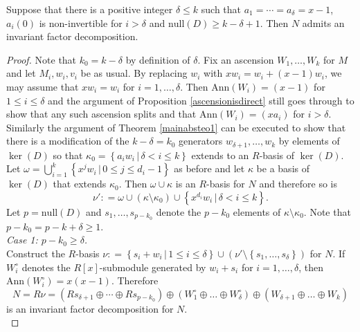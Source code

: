 \documentclass[ALCO, Unicode]{cedram}
\begin{document}
\begin{theorem}  \label{mainabsteo2}  Suppose that there  is  a positive integer  $ \delta   \leq  k    $ such that $ a_{1} = \cdots = a_{\delta} = x-1 $, $ a_{i}(0) $ is non-invertible for $ i > \delta $     and $  \mathrm{null}   (D) \geq k - \delta + 1 $.    Then $ N $ admits an invariant  factor   decomposition.    
\end{theorem}    

\begin{proof} Note that $k_0 = k - \delta$ by definition of $\delta$. Fix an ascension $ W_{1}, \ldots, W_{k} $ for $ M $ and let $ M_{i}, w_{i}, v_{i} $ be as  usual.  By replacing $ w_{i} $ with $ x w_{i} = w_{i} + (x-1)w_{i}  $, we may assume that $ x w_{i} = w_{i}  $ for $ i = 1, \ldots, \delta $. Then $ \mathrm{Ann}(W_{i}) = (x-1) $ for $1 \leq  i \leq \delta $ and the argument of Proposition \ref{ascensionisdirect} still goes through  to show that any such  ascension   splits and that $ \mathrm{Ann}(W_{i}) = ( x a_{i} ) $ for $ i > \delta $.   Similarly the argument of Theorem \ref{mainabsteo1} can be executed to show that there is a modification of  the $   k - \delta  =  k_{0}     $ generators $ w_{\delta+1} , \ldots, w_{k} $ by elements of $ \ker(D) $ so that  $ \kappa_{0}  =  \left \{ a_{i} w_{i} \, | \, \delta < i \leq k \right \} $ extends to an $R $-basis of $ \ker(D) $. Let $  \omega  = \bigcup_{i=1}^{k} \left \{  x^{j}   w_{i} \, | \, 0 \leq j \leq d_{i} - 1  \right \}  $ as before and let $ \kappa  $  be  a   basis of $ \ker (D ) $ that extends $ \kappa_{0} $. Then $ \omega \cup  \kappa $ is an $ R $-basis for $ N $ and therefore so is $$ \nu '    : = \omega   \cup ( \kappa \setminus \kappa_{0  } )  \cup \left \{ x^{d_{i}    }  w_{i} \, | \, \delta < i \leq k \right \} . $$   Let $ p  =  \mathrm{null} (D)   $ and  $ s_{1}, \ldots, s_{p-k_{0}} $ denote the $ p - k_{0} $  elements of $ \kappa \setminus \kappa_{0} $. Note that $ p - k_{0} = p - k + \delta \geq 1 $. \\

\textit{Case 1: $ p - k_{0} \geq \delta $.} \\

 Construct the $ R $-basis $ \nu : = \left \{  s_{i} +  w_{i} \,  | \,  1 \leq i \leq \delta    \right \} \cup ( \nu' \setminus \left \{  s_{1}, \ldots, s_{\delta} \right \}   )   $ for $ N $. If $ W_{i}^{\circ} $ denotes the $ R[x] $-submodule generated by $ w_{i} + s_{i} $ for $ i = 1 , \ldots, \delta $, then $ \mathrm{Ann}(W_{i}^{\circ}) = x(x-1) $. Therefore  
 $$ N = R \nu =  \left (    R s_{\delta + 1 } \oplus \cdots \oplus R s_{p-k_{0}}  \right   ) \oplus \left (   W_{1}^{\circ} \oplus \ldots  \oplus  W_{\delta}^{\circ}  \right ) \oplus \left ( W_{\delta + 1 } \oplus \ldots      \oplus W_{k} \right )   $$
is an invariant factor decomposition for  $ N $. \\


\end{proof}
\end{document}
